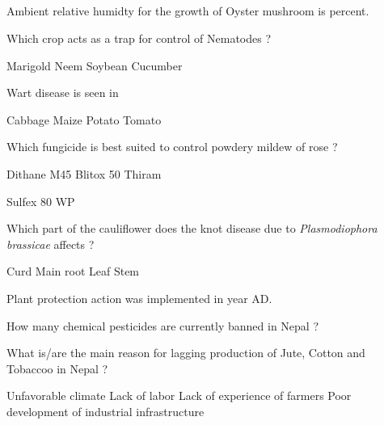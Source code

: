 
\subsection*{}

\begin{questions}

\question Ambient relative humidty for the growth of Oyster mushroom is \fillin[][3cm] percent.
\begin{choices}
\end{choices}

\question Which crop acts as a trap for control of Nematodes ?
\begin{choices}
\CorrectChoice Marigold
\choice Neem
\choice Soybean
\choice Cucumber
\end{choices}

\question Wart disease is seen in
\begin{choices}
\choice Cabbage
\choice Maize
\CorrectChoice Potato
\choice Tomato
\end{choices}

\question Which fungicide is best suited to control powdery mildew of rose ?
\begin{choices}
\choice Dithane M45
\choice Blitox 50
\choice Thiram
\end{choices}
\CorrectChoice Sulfex 80 WP

\question Which part of the cauliflower does the knot disease due to \textit{Plasmodiophora brassicae} affects ?
\begin{choices}
\choice Curd
\CorrectChoice Main root
\choice Leaf
\choice Stem
\end{choices}

\question Plant protection action was implemented in year \fillin[][3cm] AD.
\begin{choices}
\end{choices}

\question How many chemical pesticides are currently banned in Nepal ?
\begin{choices}
\end{choices}

\question What is/are the main reason for lagging production of Jute, Cotton and Tobaccoo in Nepal ?
\begin{choices}
\choice Unfavorable climate
\choice Lack of labor
\choice Lack of experience of farmers
\CorrectChoice Poor development of industrial infrastructure
\end{choices}


\end{questions}
